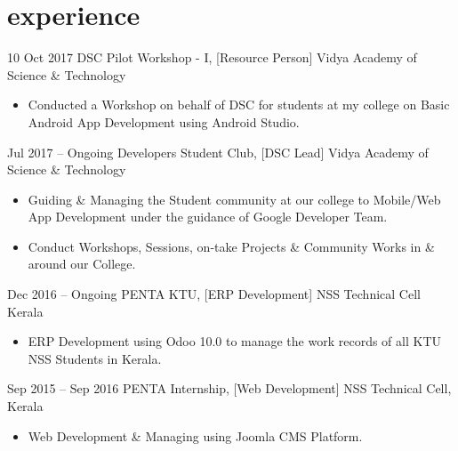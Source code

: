 \documentclass[]{friggeri-cv}
\begin{document}
\section{experience}
\begin{entrylist}

	\entry
	{10 Oct 2017}
	{DSC Pilot Workshop - I, [Resource Person]}
	{Vidya Academy of Science \& Technology}
	{\vspace{-3mm}\begin{itemize}[leftmargin=10pt,itemsep=4pt]
		\item Conducted a Workshop on behalf of DSC for students at my college on Basic Android App Development using Android Studio.
		\end{itemize}}
        
	      
	\entry
	{Jul 2017 – Ongoing}
	{Developers Student Club, [DSC Lead]}
	{Vidya Academy of Science \& Technology}
	{\vspace{-3mm}\begin{itemize}[leftmargin=10pt,itemsep=4pt]
		\item Guiding \& Managing the Student community at our college to Mobile/Web App Development under the guidance of Google Developer Team.
		\item Conduct Workshops, Sessions, on-take Projects \& Community Works in \& around our College.
		\end{itemize}}
	        
	      
	\entry
	{Dec 2016 – Ongoing}
	{PENTA KTU, [ERP Development]}
	{NSS Technical Cell Kerala}
	{\vspace{-3mm}\begin{itemize}[leftmargin=10pt,itemsep=4pt]
		\item ERP Development using Odoo 10.0 to manage the work records of all KTU NSS Students in Kerala.
		\end{itemize}}
	        
	      
	\entry
	{Sep 2015 – Sep 2016}
	{PENTA Internship, [Web Development]}
	{NSS Technical Cell, Kerala}
	{\vspace{-3mm}\begin{itemize}[leftmargin=10pt,itemsep=4pt]
		\item Web Development \& Managing using Joomla CMS Platform.
		\end{itemize}}
	        
\end{entrylist}
\newline

\newpage
\end{document}
